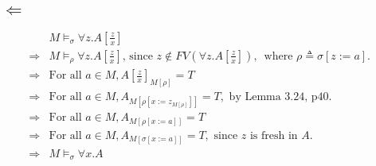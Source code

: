 \documentclass{article}
\begin{document}
\subsection*{$\Leftarrow$}
\begin{align*}
	 &M\models _\sigma\forall z. A[\frac{z}{x}]\\
	\Rightarrow &M\models _\rho\forall z. A[\frac{z}{x}] \text{, since $z \notin FV(\forall z. A[\frac{z}{x}])$, }\text{ where $\rho \triangleq \sigma[z:=a]$. } \\
	\Rightarrow & \text{For all }a \in M, A[\frac{z}{x}]_{M[\rho]} = T \\
	\Rightarrow & \text{For all }a \in M, A_{M[\rho[x := z_{M[\rho]}]]} = T, \text{ by Lemma 3.24, p40. } \\
	\Rightarrow & \text{For all }a \in M, A_{M[\rho[x:=a]]} = T \\
	\Rightarrow & \text{For all }a \in M, A_{M[\sigma[x:=a]]} = T, \text{ since $z$ is fresh in $A$. } \\
	\Rightarrow & M\models _\sigma \forall x. A
\end{align*}
\end{document}
